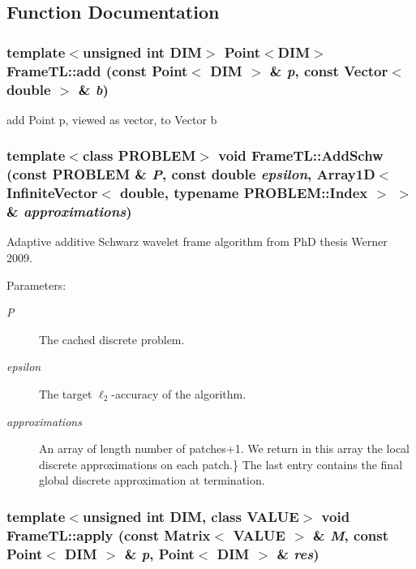 \subsection{Function Documentation}
\hypertarget{namespaceFrameTL_fd9af4210f87f330a600bdba74ca3f6d}{
\subsubsection[add]{\setlength{\rightskip}{0pt plus 5cm}template$<$unsigned int DIM$>$ Point$<$DIM$>$ FrameTL::add (const Point$<$ DIM $>$ \& {\em p}, \/  const Vector$<$ double $>$ \& {\em b})}}
\label{namespaceFrameTL_fd9af4210f87f330a600bdba74ca3f6d}


add Point p, viewed as vector, to Vector b \hypertarget{namespaceFrameTL_fae0f5be715e2324d15ca01a18665855}{
\subsubsection[AddSchw]{\setlength{\rightskip}{0pt plus 5cm}template$<$class PROBLEM$>$ void FrameTL::AddSchw (const PROBLEM \& {\em P}, \/  const double {\em epsilon}, \/  Array1D$<$ InfiniteVector$<$ double, typename PROBLEM::Index $>$ $>$ \& {\em approximations})}}
\label{namespaceFrameTL_fae0f5be715e2324d15ca01a18665855}


Adaptive additive Schwarz wavelet frame algorithm from PhD thesis Werner 2009. 

\begin{Desc}
\item[Parameters:]
\begin{description}
\item[{\em P}]The cached discrete problem. \item[{\em epsilon}]The target $\ell_2$-accuracy of the algorithm. \item[{\em approximations}]An array of length number of patches+1. We return in this array the local discrete approximations on each patch.\} The last entry contains the final global discrete approximation at termination. \end{description}
\end{Desc}
\hypertarget{namespaceFrameTL_7f2d7a0a9f79b15e8d82ff8363d06bb5}{
\subsubsection[apply]{\setlength{\rightskip}{0pt plus 5cm}template$<$unsigned int DIM, class VALUE$>$ void FrameTL::apply (const Matrix$<$ VALUE $>$ \& {\em M}, \/  const Point$<$ DIM $>$ \& {\em p}, \/  Point$<$ DIM $>$ \& {\em res})}}
\label{namespaceFrameTL_7f2d7a0a9f79b15e8d82ff8363d06bb5}


